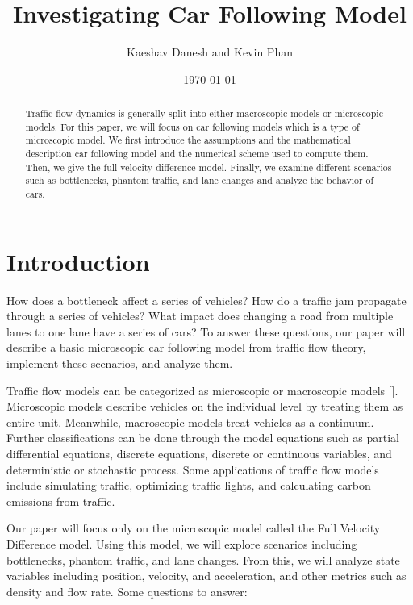\documentclass[12pt]{article}
\title{Investigating Car Following Model}
\author{Kaeshav Danesh and Kevin Phan}
\date{\today}
\begin{document}
    \maketitle

    \begin{abstract}
        Traffic flow dynamics is generally split into either macroscopic models or microscopic models. For this paper, we will focus on car following models which is a type of microscopic model. We first introduce the assumptions and the mathematical description car following model and the numerical scheme used to compute them. Then, we give the full velocity difference model. Finally, we examine different scenarios such as bottlenecks, phantom traffic, and lane changes and analyze the behavior of cars. 
    \end{abstract}

    \newpage

    \tableofcontents

    \newpage

    \section{Introduction}
    How does a bottleneck affect a series of vehicles? How do a traffic jam propagate through a series of vehicles? What impact does changing a road from multiple lanes to one lane have a series of cars? To answer these questions, our paper will describe a basic microscopic car following model from traffic flow theory, implement these scenarios, and analyze them. 

    Traffic flow models can be categorized as microscopic or macroscopic models [\cite{hisTraffic}]. Microscopic models describe vehicles on the individual level by treating them as entire unit. Meanwhile, macroscopic models treat vehicles as a continuum. Further classifications can be done through the model equations such as partial differential equations, discrete equations, discrete or continuous variables, and deterministic or stochastic process. Some applications of traffic flow models include simulating traffic, optimizing traffic lights, and calculating carbon emissions from traffic. 

    Our paper will focus only on the microscopic model called the Full Velocity Difference model. Using this model, we will explore scenarios including bottlenecks, phantom traffic, and lane changes. From this, we will analyze state variables including position, velocity, and acceleration, and other metrics such as density and flow rate. 
    Some questions to answer:
\end{document}

